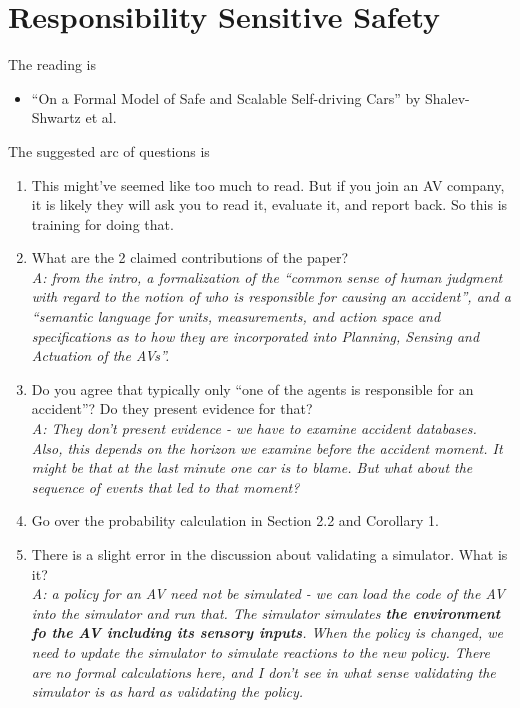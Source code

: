 \documentclass[letta4 paper]{article}
\numberwithin{equation}{section}
\newcommand{\0}{\mathbf{0}}
\begin{document}
	\section{Responsibility Sensitive Safety}
	\label{sec:rss}
	The reading is
	\begin{itemize}
		\item ``On a Formal Model of Safe and Scalable Self-driving Cars'' by Shalev-Shwartz et al.
	\end{itemize}
	
	The suggested arc of questions is
	\begin{enumerate}
		\item This might've seemed like too much to read. But if you join an AV company, it is likely they will ask you to read it, evaluate it, and report back. So this is training for doing that.
		
		\item What are the 2 claimed contributions of the paper?
		\\
		\textit{A: from the intro, a formalization of the ``common sense of human judgment with regard to the notion of who is responsible for causing an accident'', and a ``semantic language for units, measurements, and action space and specifications as to how they are incorporated into Planning, Sensing and Actuation of the AVs''.}
		
		\item Do you agree that typically only ``one of the agents is responsible for an accident''? Do they present evidence for that?
		\\
		\textit{A: They don't present evidence - we have to examine accident databases. Also, this depends on the horizon we examine before the accident moment. It might be that at the last minute one car is to blame. But what about the sequence of events that led to that moment? }
		
		\item Go over the probability calculation in Section 2.2 and Corollary 1. 
		
		\item There is a slight error in the discussion about validating a simulator. What is it?
		\\
		\textit{A: a policy for an AV need not be simulated - we can load the code of the AV into the simulator and run that. The simulator simulates \textbf{the environment fo the AV including its sensory inputs}. When the policy is changed, we need to update the simulator to simulate reactions to the new policy. There are no formal calculations here, and I don't see in what sense validating the simulator is as hard as validating the policy.}
		

\end{enumerate}
\end{document}
